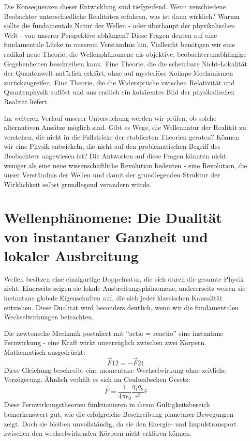 Die Konsequenzen dieser Entwicklung sind tiefgreifend. Wenn verschiedene Beobachter unterschiedliche Realitäten erfahren, was ist dann wirklich? Warum sollte die fundamentale Natur
der Wellen - oder überhaupt der physikalischen Welt - von unserer Perspektive abhängen? Diese Fragen deuten auf eine fundamentale Lücke in unserem Verständnis hin. Vielleicht benötigen
wir eine radikal neue Theorie, die Wellenphänomene als objektive, beobachterunabhängige Gegebenheiten beschreiben kann. Eine Theorie, die die scheinbare Nicht-Lokalität der Quantenwelt
natürlich erklärt, ohne auf mysteriöse Kollaps-Mechanismen zurückzugreifen. Eine Theorie, die die Widersprüche zwischen Relativität und Quantenphysik auflöst und uns endlich ein kohärentes
Bild der physikalischen Realität liefert.

Im weiteren Verlauf unserer Untersuchung werden wir prüfen, ob solche alternativen Ansätze möglich sind. Gibt es Wege, die Wellennatur der Realität zu verstehen, die nicht in die
Fallstricke der etablierten Theorien geraten? Können wir eine Physik entwickeln, die nicht auf den problematischen Begriff des Beobachters angewiesen ist? Die Antworten auf diese Fragen
könnten nicht weniger als eine neue wissenschaftliche Revolution bedeuten - eine Revolution, die unser Verständnis der Wellen und damit der grundlegenden Struktur der Wirklichkeit selbst
grundlegend verändern würde.

\section{Wellenphänomene: Die Dualität von instantaner Ganzheit und lokaler Ausbreitung}
Wellen besitzen eine einzigartige Doppelnatur, die sich durch die gesamte Physik zieht. Einerseits zeigen sie lokale Ausbreitungsphänomene, andererseits weisen sie instantane globale
Eigenschaften auf, die sich jeder klassischen Kausalität entziehen. Diese Dualität wird besonders deutlich, wenn wir die fundamentalen Wechselwirkungen betrachten.

Die newtonsche Mechanik postuliert mit \enquote{actio = reactio} eine instantane Fernwirkung - eine Kraft wirkt unverzüglich zwischen zwei Körpern. Mathematisch ausgedrückt:
\[
    \vec{F}{12} = -\vec{F}{21}
\]
Diese Gleichung beschreibt eine momentane Wechselwirkung ohne zeitliche Verzögerung. Ähnlich verhält es sich im Coulombschen Gesetz:
\[
    \vec{F} = \frac{1}{4\pi\epsilon_0}\frac{q_1q_2}{r^2}\hat{r}
\]
Diese Fernwirkungstheorien funktionieren in ihrem Gültigkeitsbereich bemerkenswert gut, wie die erfolgreiche Beschreibung planetarer Bewegungen zeigt. Doch sie bleiben unvollständig,
da sie den Energie- und Impulstransport zwischen den wechselwirkenden Körpern nicht erklären können.

